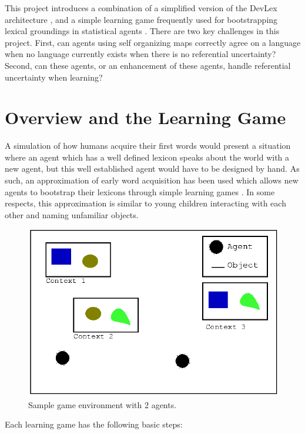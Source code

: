 \documentclass[a4paper,11pt]{article}
\begin{document}
This project introduces a combination of a simplified version of the DevLex
architecture \cite{LiDevLex}, and a simple learning game frequently used for
bootstrapping lexical groundings in statistical agents
\cite{VogtLearningSim,VogtSocial}.  There are two key challenges in this
project.  First, can agents using self organizing maps correctly agree on a
language when no language currently exists when there is no referential
uncertainty?  Second, can these agents, or an enhancement of these agents,
handle referential uncertainty when learning?

\section{Overview and the Learning Game}
A simulation of how humans acquire their first words would present a situation
where an agent which has a well defined lexicon speaks about the world with a new
agent, but this well established agent would have to be designed by hand.  As
such, an approximation of early word acquisition has been used which allows new
agents to bootstrap their lexicons through simple learning games
\cite{VogtLearningSim,VogtSocial}.  In some respects, this approximation is
similar to young children interacting with each other and naming unfamiliar
objects. 

\begin{figure} \center \includegraphics[width=.49\textwidth]{game-env.eps}
\caption{Sample game environment with 2 agents.} \label{fig:game-env}
\end{figure}

Each learning game has the following basic steps:
\end{document}
